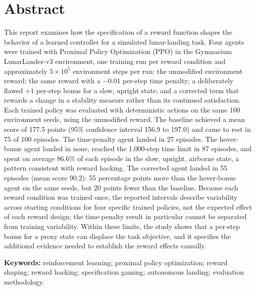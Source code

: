 \documentclass[11pt,a4paper]{article}
\begin{document}
\setcounter{page}{2}

\section*{Abstract}

This report examines how the specification of a reward function shapes the behavior of a learned controller for a simulated lunar-landing task. Four agents were trained with Proximal Policy Optimization (PPO) in the Gymnasium LunarLander-v3 environment, one training run per reward condition and approximately $5\times10^{5}$ environment steps per run: the unmodified environment reward; the same reward with a $-0.01$ per-step time penalty; a deliberately flawed $+1$ per-step bonus for a slow, upright state; and a corrected term that rewards a change in a stability measure rather than its continued satisfaction. Each trained policy was evaluated with deterministic actions on the same 100 environment seeds, using the unmodified reward. The baseline achieved a mean score of 177.5 points (95\% confidence interval 156.9 to 197.0) and came to rest in 75 of 100 episodes. The time-penalty agent landed in 27 episodes. The hover-bonus agent landed in none, reached the 1{,}000-step time limit in 87 episodes, and spent on average 86.6\% of each episode in the slow, upright, airborne state, a pattern consistent with reward hacking. The corrected agent landed in 55 episodes (mean score 90.2): 55 percentage points more than the hover-bonus agent on the same seeds, but 20 points fewer than the baseline. Because each reward condition was trained once, the reported intervals describe variability across starting conditions for four specific trained policies, not the expected effect of each reward design; the time-penalty result in particular cannot be separated from training variability. Within these limits, the study shows that a per-step bonus for a proxy state can displace the task objective, and it specifies the additional evidence needed to establish the reward effects causally.

\vspace{4pt}
{\small\textbf{Keywords:} reinforcement learning; proximal policy optimization; reward shaping; reward hacking; specification gaming; autonomous landing; evaluation methodology.}

\clearpage
{\hypersetup{linkcolor=charcoal}
\tableofcontents}
\clearpage
{\hypersetup{linkcolor=charcoal}
\listoffigures
\vspace{4mm}
\listoftables}
\clearpage
{}
\end{document}
